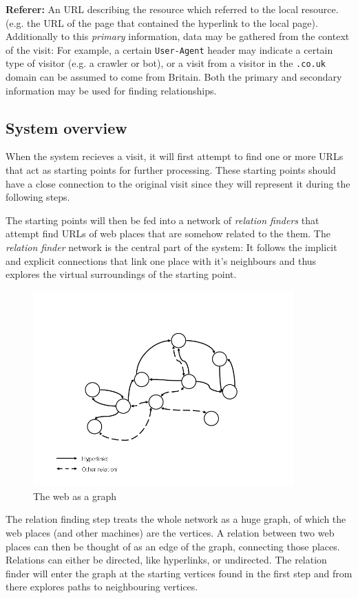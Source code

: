 \documentclass[a4paper]{danarticle}
\theoremstyle{remark}
\begin{document}
    \textbf{Referer:} An URL describing the resource which referred to the local 
    resource. (e.g. the URL of the page that contained the hyperlink to the 
    local page).
    \\
    
    Additionally to
    this \textit{primary} information, data may be gathered from the
    context of the visit: For example, a certain \verb$User-Agent$ header 
    may indicate a certain type of visitor (e.g. a crawler or bot), or a visit
    from a visitor in the \verb$.co.uk$ domain can be assumed to come from
    Britain. Both the primary and secondary information may be used for finding
    relationships.
    \subsection{System overview}
      When the system recieves a visit, it will first attempt to find one or 
      more URLs that act as starting points for further processing. These 
      starting points should have a close connection to the original visit since 
      they will represent it during the following steps.
      
      The starting points will then be fed into a network of \textit{relation 
      finders} that attempt find URLs of web places that are somehow related to 
      the them. The \textit{relation finder} network is the central part of the 
      system: It follows the implicit and explicit connections that link one 
      place with it's neighbours and thus explores the virtual surroundings of 
      the starting point. 
      
      \begin{figure}[ht]
        \centering
        \includegraphics[width=10cm]{webgraph}
        \caption{The web as a graph}
        \label{webgraph}
      \end{figure}
      The relation finding step treats the whole network as a huge graph, of
      which the web places (and other machines) are the vertices. A relation
      between two web places can then be thought of as an edge of the graph,
      connecting those places. Relations can either be directed, like
      hyperlinks, or undirected. The relation finder will enter the graph at the
      starting vertices found in the first step and from there explores paths to
      neighbouring vertices.
      
\end{document}
